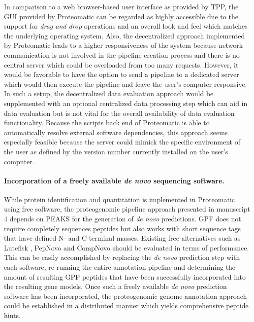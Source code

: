 In comparison to a web browser-based user interface as provided by TPP, the 
GUI provided by Proteomatic can be regarded as highly accessible due to 
the support for {\em drag and drop} operations and an overall look and feel
which matches the underlying operating system.
Also, the decentralized approach implemented by Proteomatic leads to a
higher responsiveness of the system because network communication is not 
involved in the pipeline creation process and there is no central server which
could be overloaded from too many requests.
However, it would be favorable to have the option to send a pipeline to a 
dedicated server which would then execute the pipeline and leave the 
user's computer responsive.
In such a setup, the decentralized data evaluation approach would be 
supplemented with an optional centralized data processing step which can
aid in data evaluation but is not vital for the overall availability of
data evaluation functionality.
Because the scripts back end of Proteomatic is able to automatically resolve 
external software dependencies, this approach seems especially feasible because
the server could mimick the specific environment of the user as defined by
the version number currently installed on the user's computer.

\paragraph{Incorporation of a freely available {\em de novo} sequencing software.}

While protein identification and quantitation is implemented in Proteomatic
using free software, the proteogenomic pipeline approach presented in 
manuscript 4 depends on PEAKS for the generation of {\em de novo} predictions.
GPF does not require completely sequences peptides but also works with
short sequence tags that have defined N- and C-terminal masses.
Existing free alternatives such as Lutefisk \citep{Johnson2002}, PepNovo 
\citep{Frank2005} and CompNovo \citep{Bertsch2009} should be evaluated in
terms of performance.
This can be easily accomplished by replacing the {\em de novo} prediction
step with each software, re-running the entire annotation pipeline and 
determining the amount of resulting GPF peptides that have been successfully
incorporated into the resulting gene models.
Once such a freely available {\em de novo} prediction software has been
incorporated, the proteogenomic genome annotation approach could be 
established in a distributed manner which yields comprehensive peptide hints.

